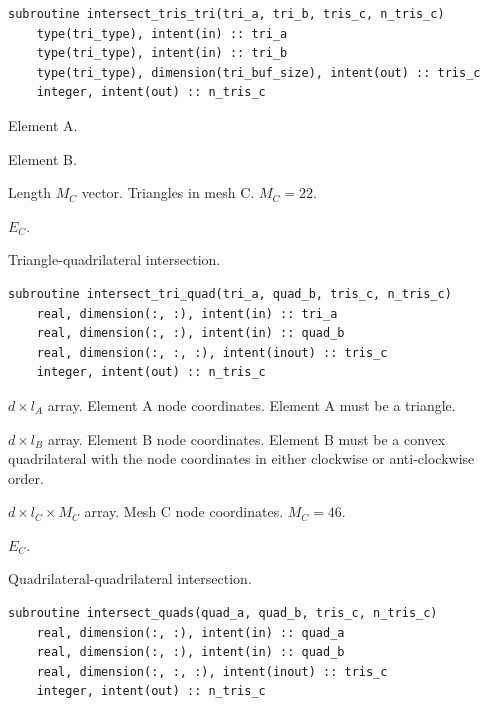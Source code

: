 \documentclass{article}
\begin{document}
\begin{lstlisting}[language=FORTRAN]
  subroutine intersect_tris_tri(tri_a, tri_b, tris_c, n_tris_c)
    type(tri_type), intent(in) :: tri_a
    type(tri_type), intent(in) :: tri_b
    type(tri_type), dimension(tri_buf_size), intent(out) :: tris_c
    integer, intent(out) :: n_tris_c
\end{lstlisting}

\begin{description}[font=\ttfamily\bfseries,leftmargin=2.2\parindent,labelindent=1.7\parindent,noitemsep]
  \item[tri\_a] Element A.
  \item[tri\_b] Element B.
  \item[tris\_c] Length $M_C$ vector. Triangles in mesh C. $M_C = 22$.
  \item[n\_tris\_c] $E_C$.
\end{description}

\noindent Triangle-quadrilateral intersection.

\begin{lstlisting}[language=FORTRAN]
  subroutine intersect_tri_quad(tri_a, quad_b, tris_c, n_tris_c)
    real, dimension(:, :), intent(in) :: tri_a
    real, dimension(:, :), intent(in) :: quad_b
    real, dimension(:, :, :), intent(inout) :: tris_c
    integer, intent(out) :: n_tris_c
\end{lstlisting}

\begin{description}[font=\ttfamily\bfseries,leftmargin=2.2\parindent,labelindent=1.7\parindent,noitemsep]
  \item[tri\_a] $d \times l_A$ array. Element A node coordinates. Element A
    must be a triangle.
  \item[quad\_b] $d \times l_B$ array. Element B node coordinates. Element B
    must be a convex quadrilateral with the node coordinates in either clockwise
    or anti-clockwise order.
  \item[tris\_c] $d \times l_C \times M_C$ array. Mesh C node coordinates.
    $M_C = 46$.
  \item[n\_tris\_c] $E_C$.
\end{description}

\noindent Quadrilateral-quadrilateral intersection.

\begin{lstlisting}[language=FORTRAN]
  subroutine intersect_quads(quad_a, quad_b, tris_c, n_tris_c)
    real, dimension(:, :), intent(in) :: quad_a
    real, dimension(:, :), intent(in) :: quad_b
    real, dimension(:, :, :), intent(inout) :: tris_c
    integer, intent(out) :: n_tris_c
\end{lstlisting}
\end{document}
